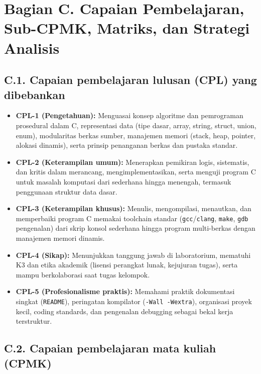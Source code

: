 \documentclass[12pt,a4paper]{article}
\begin{document}
\section*{Bagian C. Capaian Pembelajaran, Sub-CPMK, Matriks, dan Strategi Analisis}

\subsection*{C.1. Capaian pembelajaran lulusan (CPL) yang dibebankan}

\begin{itemize}[leftmargin=*]
  \item \textbf{CPL-1 (Pengetahuan):} Menguasai konsep algoritme dan pemrograman prosedural dalam C, representasi data (tipe dasar, array, string, struct, union, enum), modularitas berkas sumber, manajemen memori (stack, heap, pointer, alokasi dinamis), serta prinsip penanganan berkas dan pustaka standar.
  \item \textbf{CPL-2 (Keterampilan umum):} Menerapkan pemikiran logis, sistematis, dan kritis dalam merancang, mengimplementasikan, serta menguji program C untuk masalah komputasi dari sederhana hingga menengah, termasuk penggunaan struktur data dasar.
  \item \textbf{CPL-3 (Keterampilan khusus):} Menulis, mengompilasi, menautkan, dan memperbaiki program C memakai toolchain standar (\texttt{gcc}/\texttt{clang}, \texttt{make}, \texttt{gdb} pengenalan) dari skrip konsol sederhana hingga program multi-berkas dengan manajemen memori dinamis.
  \item \textbf{CPL-4 (Sikap):} Menunjukkan tanggung jawab di laboratorium, mematuhi K3 dan etika akademik (lisensi perangkat lunak, kejujuran tugas), serta mampu berkolaborasi saat tugas kelompok.
  \item \textbf{CPL-5 (Profesionalisme praktis):} Memahami praktik dokumentasi singkat (\texttt{README}), peringatan kompilator (\texttt{-Wall -Wextra}), organisasi proyek kecil, coding standards, dan pengenalan debugging sebagai bekal kerja terstruktur.
\end{itemize}

\subsection*{C.2. Capaian pembelajaran mata kuliah (CPMK)}
\end{document}
